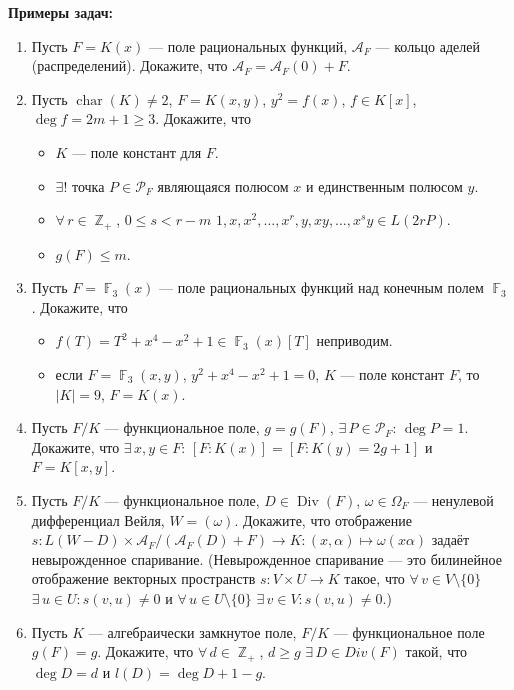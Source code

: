 \documentclass[a4paper, 12pt]{article}
\DeclareMathOperator{\ZZ}{\mathbb{Z}}
\DeclareMathOperator{\FF}{\mathbb{F}}
\DeclareMathOperator{\Div}{Div}
\DeclareMathOperator{\chr}{char}
\begin{document}
{\bf Примеры задач:}
\begin{enumerate}[noitemsep,topsep=0pt]
    \item Пусть $F=K(x)$ --- поле рациональных функций, $\mathcal{A}_F$ --- кольцо аделей (распределений). Докажите, что $\mathcal{A}_F=\mathcal{A}_F(0)+F$. %
    \item Пусть $\chr(K)\neq 2$, $F=K(x,y)$, $y^2=f(x)$, $f\in K[x]$, $\deg f = 2m+1\geqslant 3$. Докажите, что
    \begin{itemize}[noitemsep,topsep=0pt]
        \item $K$ --- поле констант для $F$.
        \item $\exists!$ точка $P\in\mathcal{P}_F$ являющаяся полюсом $x$ и единственным полюсом $y$.
        \item $\forall\, r\in\ZZ_{+}$, $0\leqslant s <r-m$ $1,x,x^2,\dots,x^r,y,xy,\dots,x^s y \in L(2r P)$.
        \item $g(F)\leqslant m$.
    \end{itemize} %
    \item Пусть $F=\FF_3(x)$ --- поле рациональных функций над конечным полем $\FF_3$. Докажите, что
    \begin{itemize}[noitemsep,topsep=0pt]
        \item $f(T)=T^2+x^4-x^2+1 \in \FF_3(x)[T]$ неприводим.
        \item если $F=\FF_3(x,y)$, $y^2+x^4-x^2+1=0$, $K$ --- поле констант $F$, то $|K|=9$, $F=K(x)$.
    \end{itemize} %
    \item Пусть $F/K$ --- функциональное поле, $g=g(F)$, $\exists\, P\in \mathcal{P}_F$: $\deg P = 1$. Докажите, что $\exists\, x,y\in F$: $[F:K(x)]=[F:K(y)=2g+1]$ и $F=K[x,y]$. %
    \item Пусть $F/K$ --- функциональное поле, $D\in\Div(F)$, $\omega\in\Omega_F$ --- ненулевой дифференциал Вейля, $W=(\omega)$. Докажите, что отображение $s:L(W-D) \times \mathcal{A}_F/(\mathcal{A}_F(D)+F) \rightarrow K: (x,\alpha) \mapsto \omega(x\alpha)$ задаёт невырожденное спаривание. (Невырожденное спаривание --- это билинейное отображение векторных пространств $s:V\times U \rightarrow K$ такое, что $\forall\,v\in V\setminus\{0\}$ $\exists\,u\in U: s(v,u)\neq 0$ и $\forall\,u\in U\setminus\{0\}$ $\exists\,v\in V: s(v,u)\neq 0$.) %
    \item Пусть $K$ --- алгебраически замкнутое поле, $F/K$ --- функциональное поле $g(F)=g$. Докажите, что $\forall\, d\in\ZZ_{+}$, $d\geqslant g$ $\exists\, D\in Div(F)$ такой, что $\deg D = d$ и $l(D)=\deg D +1 - g$. %

\end{enumerate}
\end{document}
